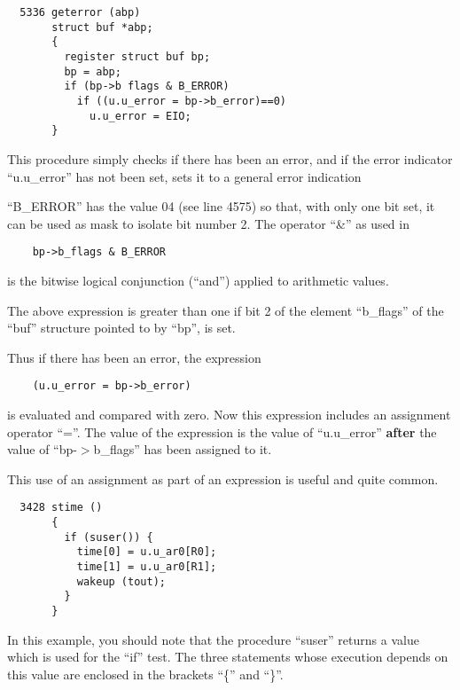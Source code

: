
\begin{verbatim}
  5336 geterror (abp)
       struct buf *abp;
       {
         register struct buf bp;
         bp = abp;
         if (bp->b flags & B_ERROR)
           if ((u.u_error = bp->b_error)==0)
             u.u_error = EIO;
       }
\end{verbatim}



This procedure simply checks if there
has been an error, and if the error
indicator ``u.u\_error'' has not been set,
sets it to a general error indication

``B\_ERROR'' has the value 04 (see line
4575) so that, with only one bit set,
it can be used as mask to isolate bit
number 2. The operator ``\&'' as used in

\begin{verbatim}
    bp->b_flags & B_ERROR
\end{verbatim}

\noindent is the bitwise logical conjunction
(``and'') applied to arithmetic values.

The above expression is greater than
one if bit 2 of the element ``b\_flags''
of the ``buf'' structure pointed to by
``bp'', is set.

Thus if there has been an error, the
expression

\begin{verbatim}
    (u.u_error = bp->b_error)
\end{verbatim}

\noindent is evaluated and compared with zero.
Now this expression includes an assignment operator ``=''.
The value of the expression is the value of ``u.u\_error''
{\bf after} the value of ``bp-$>$b\_flags'' has
been assigned to it.

This use of an assignment as part of an
expression is useful and quite common.



\begin{verbatim}
  3428 stime ()
       {
         if (suser()) {
           time[0] = u.u_ar0[R0];
           time[1] = u.u_ar0[R1];
           wakeup (tout);
         }
       }
\end{verbatim}

In this example, you should note that
the procedure ``suser'' returns a value
which is used for the ``if'' test. The
three statements whose execution
depends on this value are enclosed in
the brackets ``\{'' and ``\}''.


